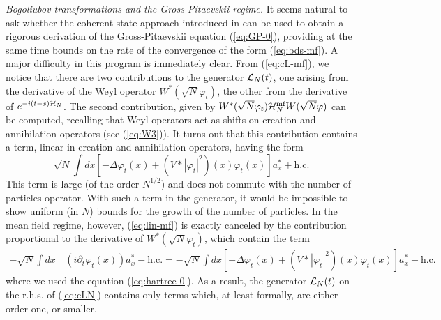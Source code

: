 \documentclass[11pt,a4paper]{article}
\newcommand{\cH}{{\cal H}}
\newcommand{\cL}{{\cal L}}
\begin{document}
{\it Bogoliubov transformations and the Gross-Pitaevskii regime.} It seems natural to ask whether the coherent state approach introduced in \cite{RS} can be used to obtain a rigorous derivation of the Gross-Pitaevskii equation (\ref{eq:GP-0}), providing at the same time bounds on the rate of the convergence of the form (\ref{eq:bds-mf}). A major difficulty in this program is immediately clear. 
{F}rom (\ref{eq:cL-mf}), we notice that there are two contributions to the generator $\cL_N (t)$, one 
 arising from the derivative of the Weyl operator $W^* (\sqrt{N} \varphi_t)$, the other from the derivative of $e^{-i (t-s) \cH_N}$. The second contribution, given by $W^* (\sqrt{N} \varphi_t) \cH^{\text{mf}}_N W(\sqrt{N} \varphi)$ can be computed, recalling that Weyl operators act as shifts on creation and annihilation operators (see (\ref{eq:W3})). It turns out that this contribution contains a term, linear in creation and annihilation operators, having the form
\begin{equation}\label{eq:lin-mf}  \sqrt{N} \int dx \left[ -\Delta \varphi_t (x) + (V*|\varphi_t|^2) (x) \varphi_t (x) \right] a_x^* + \text{h.c.} \end{equation}
This term is large (of the order $N^{1/2}$) and does not commute with the number of particles operator. With such a term in the generator, it would be impossible to show uniform (in $N$) bounds for the growth of the number of particles. In the mean field regime, however, (\ref{eq:lin-mf}) is exactly 
canceled by the contribution proportional to the derivative of $W^* (\sqrt{N} \varphi_t)$, which contain the term
\[ \begin{split} -\sqrt{N} \int dx \, & ( i \partial_t \varphi_t (x) ) a_x^* - \text{h.c.} = -
\sqrt{N} \int dx \left[ -\Delta \varphi_t (x) + (V*|\varphi_t|^2) (x) \varphi_t (x) \right] a_x^* - \text{h.c.} 
\end{split}
\]
where we used the equation (\ref{eq:hartree-0}). As a result, the generator $\cL_N (t)$ on the r.h.s. of (\ref{eq:cLN}) contains only terms which, at least formally, are either order one, or smaller. 
\end{document}
